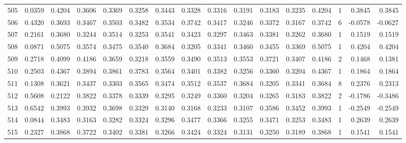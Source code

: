 \begin{tabular}{lrrrrrrrrrrrrrrr}
505 &      0.0359 &  0.4204 &  0.3606 &  0.3369 &  0.3258 &  0.3443 &  0.3328 &  0.3316 &  0.3191 &  0.3183 &   0.3235 &     0.4204 &      1 &                    0.3845 &                     0.3845 \\
506 &      0.4320 &  0.3693 &  0.3467 &  0.3503 &  0.3482 &  0.3534 &  0.3742 &  0.3417 &  0.3246 &  0.3372 &   0.3167 &     0.3742 &      6 &                   -0.0578 &                    -0.0627 \\
507 &      0.2161 &  0.3680 &  0.3244 &  0.3514 &  0.3253 &  0.3541 &  0.3423 &  0.3297 &  0.3463 &  0.3381 &   0.3262 &     0.3680 &      1 &                    0.1519 &                     0.1519 \\
508 &      0.0871 &  0.5075 &  0.3574 &  0.3475 &  0.3540 &  0.3684 &  0.3205 &  0.3341 &  0.3460 &  0.3455 &   0.3369 &     0.5075 &      1 &                    0.4204 &                     0.4204 \\
509 &      0.2718 &  0.4099 &  0.4186 &  0.3659 &  0.3218 &  0.3559 &  0.3490 &  0.3513 &  0.3553 &  0.3721 &   0.3407 &     0.4186 &      2 &                    0.1468 &                     0.1381 \\
510 &      0.2503 &  0.4367 &  0.3894 &  0.3861 &  0.3783 &  0.3564 &  0.3401 &  0.3382 &  0.3256 &  0.3360 &   0.3204 &     0.4367 &      1 &                    0.1864 &                     0.1864 \\
511 &      0.1308 &  0.3621 &  0.3437 &  0.3303 &  0.3565 &  0.3474 &  0.3512 &  0.3537 &  0.3684 &  0.3205 &   0.3341 &     0.3684 &      8 &                    0.2376 &                     0.2313 \\
512 &      0.5608 &  0.2122 &  0.3822 &  0.3378 &  0.3339 &  0.3295 &  0.3249 &  0.3360 &  0.3204 &  0.3265 &   0.3183 &     0.3822 &      2 &                   -0.1786 &                    -0.3486 \\
513 &      0.6542 &  0.3993 &  0.3932 &  0.3698 &  0.3329 &  0.3140 &  0.3168 &  0.3233 &  0.3107 &  0.3586 &   0.3452 &     0.3993 &      1 &                   -0.2549 &                    -0.2549 \\
514 &      0.0844 &  0.3483 &  0.3163 &  0.3282 &  0.3324 &  0.3296 &  0.3477 &  0.3366 &  0.3255 &  0.3471 &   0.3253 &     0.3483 &      1 &                    0.2639 &                     0.2639 \\
515 &      0.2327 &  0.3868 &  0.3722 &  0.3402 &  0.3381 &  0.3266 &  0.3424 &  0.3324 &  0.3131 &  0.3250 &   0.3189 &     0.3868 &      1 &                    0.1541 &                     0.1541 \\

\end{tabular}
